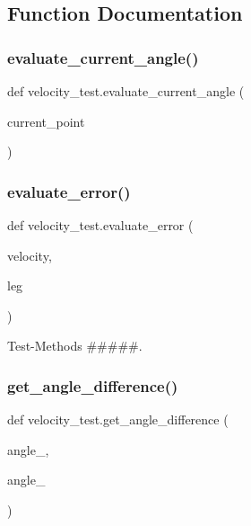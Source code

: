 \subsection{Function Documentation}
\mbox{\label{namespacevelocity__test_a5f76d6bc3a4b720b080228a4c4576725}} 
\subsubsection{\texorpdfstring{evaluate\_current\_angle()}{evaluate\_current\_angle()}}
{\footnotesize\ttfamily def velocity\+\_\+test.\+evaluate\+\_\+current\+\_\+angle (\begin{DoxyParamCaption}\item[{}]{current\+\_\+point }\end{DoxyParamCaption})}

\mbox{\label{namespacevelocity__test_a39ca1f32ae8d0b7035cb207c50722da0}} 
\subsubsection{\texorpdfstring{evaluate\_error()}{evaluate\_error()}}
{\footnotesize\ttfamily def velocity\+\_\+test.\+evaluate\+\_\+error (\begin{DoxyParamCaption}\item[{}]{velocity,  }\item[{}]{leg }\end{DoxyParamCaption})}



Test-\/\+Methods \#\#\#\#\#. 

\mbox{\label{namespacevelocity__test_a3b7c195a552b65290f4344865f48948e}} 
\subsubsection{\texorpdfstring{get\_angle\_difference()}{get\_angle\_difference()}}
{\footnotesize\ttfamily def velocity\+\_\+test.\+get\+\_\+angle\+\_\+difference (\begin{DoxyParamCaption}\item[{}]{angle\+\_,  }\item[{}]{angle\+\_ }\end{DoxyParamCaption})}

